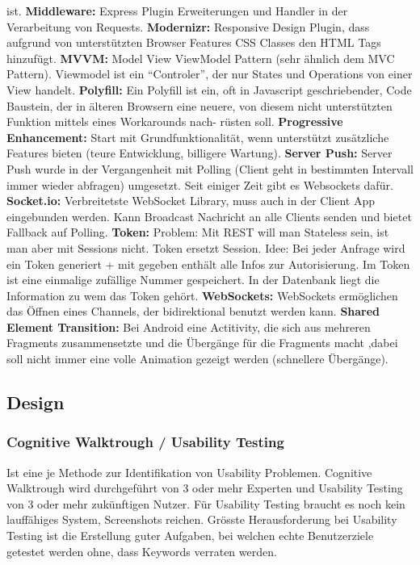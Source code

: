 \begin{multicols*}{4}
ist.
\textbf{\color{ForestGreen}Middleware:}
Express Plugin Erweiterungen und Handler in der Verarbeitung von Requests.
\textbf{\color{ForestGreen}Modernizr:} Responsive Design Plugin, dass aufgrund von unterstützten Browser 
Features CSS Classes den HTML Tags hinzufügt.
\textbf{\color{ForestGreen}MVVM:} Model View ViewModel  Pattern  (sehr  ähnlich  dem  MVC  Pattern).  
Viewmodel  ist  ein 
“Controler”, der nur States und Operations von 
einer 
View handelt.
\textbf{\color{ForestGreen}Polyfill:} Ein  Polyfill  ist  ein,  oft  in  Javascript  geschriebender,  Code
Baustein,  der  in  älteren 
Browsern eine neuere, von 
diesem nicht unterstützten Funktion
mittels eines Workarounds nach-
rüsten soll. 
\textbf{\color{ForestGreen}Progressive Enhancement:}
Start mit Grundfunktionalität, wenn unterstützt zusätzliche Features 
bieten (teure Entwicklung, billigere Wartung). 
\textbf{\color{ForestGreen}Server  Push:} 
Server  Push  wurde  in  der  Vergangenheit  mit  Polling  (Client  geht  in  bestimmten 
Intervall immer wieder abfragen) umgesetzt. Seit einiger Zeit gibt es Websockets dafür. 
\textbf{\color{ForestGreen}Socket.io:} Verbreitetste WebSocket Library, muss 
auch in der Client App eingebunden werden. 
Kann Broadcast Nachricht an alle Clients senden und bietet Fallback auf Polling.
\textbf{\color{ForestGreen}Token:} 
Problem:  Mit  REST  will  man  Stateless
sein,  ist  man  aber  mit  Sessions  nicht.  Token 
ersetzt  Session.  Idee:  Bei  jeder  Anfrage  wird  ein  Token  generiert  +  mit  gegeben 
enthält  alle Infos zur Autorisierung. Im Token ist eine einmalige zufällige Nummer gespeichert. In der
 Datenbank liegt die Information zu wem das Token gehört. 
\textbf{\color{ForestGreen}WebSockets:} WebSockets  ermöglichen  das  Öffnen  eines  
Channels,  der  bidirektional  benutzt 
werden kann. 
\textbf{\color{ForestGreen}Shared Element Transition:} Bei Android eine 
Actitivity, die sich aus mehreren Fragments zusammensetzte und die Übergänge für 
die Fragments macht ,dabei soll nicht immer eine volle Animation gezeigt werden (schnellere 
Übergänge).


\subsection{Design}
\begin{multicols}{2}
\subsubsection{Cognitive Walktrough / Usability Testing}
\tiny Ist eine je Methode zur Identifikation von Usability Problemen. Cognitive 
Walktrough wird durchgeführt von 3 oder mehr Experten und Usability Testing 
von 3 oder mehr zukünftigen Nutzer. Für Usability Testing braucht es noch kein 
lauffähiges System, Screenshots reichen. Grösste Herausforderung bei Usability 
Testing ist die Erstellung guter Aufgaben, bei welchen echte Benutzerziele getestet 
werden ohne, dass Keywords verraten werden.

\end{multicols}
\end{multicols*}
